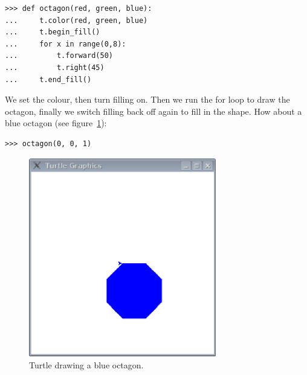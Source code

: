 \begin{listing}
\begin{verbatim}
>>> def octagon(red, green, blue):
...     t.color(red, green, blue)
...     t.begin_fill()
...     for x in range(0,8):
...         t.forward(50)
...         t.right(45)
...     t.end_fill()
\end{verbatim}
\end{listing}

We set the colour, then turn filling on.  Then we run the for loop to draw the octagon, finally we switch filling back off again to fill in the shape. How about a blue octagon (see figure~\ref{fig49}):

\begin{listing}
\begin{verbatim}
>>> octagon(0, 0, 1)
\end{verbatim}
\end{listing}

\begin{figure}
\begin{center}
\includegraphics[width=82mm]{eps/figure49.eps}
\end{center}
\caption{Turtle drawing a blue octagon.}\label{fig49}
\end{figure}
\newpage
